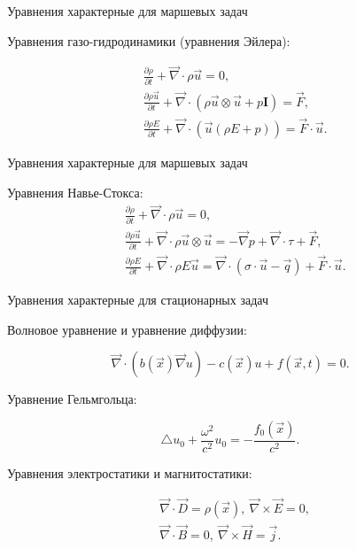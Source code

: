 \documentclass[10pt,xcolor=pst,aspectratio=169]{beamer}
\begin{document}
\begin{frame}{Уравнения характерные для маршевых задач}

	\transdissolve[duration=0.1]
	\justifying
	\large

	Уравнения газо-гидродинамики (уравнения Эйлера):

	\[
		\begin{split}
			&\frac{\partial \rho}{\partial t}
				+ \vec{\nabla} \cdot \rho \vec{u}
				= 0, \\
			&\frac{\partial \rho \vec{u}}{\partial t}
				+ \vec{\nabla} \cdot \left( \rho \vec{u} \otimes \vec{u} + p \textbf{I} \right)
				=
				\vec{F}, \\
			&\frac{\partial \rho E}{\partial t}
				+ \vec{\nabla} \cdot \left( \vec{u} \left( \rho E + p \right) \right)
				=
				\vec{F} \cdot \vec{u}.
			\end{split}
	\]

\end{frame}

\begin{frame}{Уравнения характерные для маршевых задач}

	\transdissolve[duration=0.1]
	\justifying
	\large

    Уравнения Навье-Стокса:
	\[
		\begin{split}
			&\frac{\partial \rho}{\partial t}
				+ \vec{\nabla} \cdot \rho \vec{u}
				= 0, \\
			&\frac{\partial \rho \vec{u}}{\partial t}
				+ \vec{\nabla} \cdot \rho \vec{u} \otimes \vec{u}
				=
				- \vec{\nabla} p
				+ \vec{\nabla} \cdot \tau
				+ \vec{F}, \\
			&\frac{\partial \rho E}{\partial t}
				+ \vec{\nabla} \cdot \rho E \vec{u}
				=
				\vec{\nabla} \cdot \left( \sigma \cdot \vec{u} - \vec{q} \right)
				+ \vec{F} \cdot \vec{u}.
			\end{split}
	\]

\end{frame}

\begin{frame}{Уравнения характерные для стационарных задач}

	\transdissolve[duration=0.1]
	\justifying
	\large

    Волновое уравнение и уравнение диффузии:
   
	\[
		\vec{\nabla} \cdot \left( b(\vec{x}) \vec{\nabla} u \right) - c(\vec{x}) u + f(\vec{x}, t) = 0.
	\]

    Уравнение Гельмгольца:

	\[
		\triangle u_{0} + \frac{\omega^{2}}{c^2} u_{0} = - \frac{f_{0}(\vec{x})}{c^{2}}.
	\]

    Уравнения электростатики и магнитостатики:

	\[
		\begin{split}
			&\vec{\nabla} \cdot \vec{D} = \rho (\vec{x}), \:
			\vec{\nabla} \times \vec{E} = 0, \\
			&\vec{\nabla} \cdot \vec{B} = 0, \:
			\vec{\nabla} \times \vec{H} = \vec{j}.
		\end{split}
	\]

\end{frame}
\end{document}
